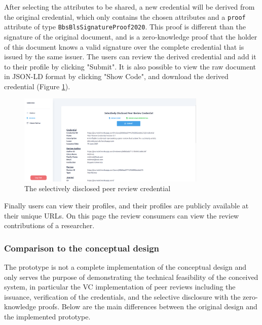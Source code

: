 After selecting the attributes to be shared, a new credential will be derived from the original credential, which only contains the chosen attributes and a \lstinline{proof} attribute of type \lstinline{BbsBlsSignatureProof2020}. This proof is different than the signature of the original document, and is a zero-knowledge proof that the holder of this document knows a valid signature over the complete credential that is issued by the same issuer. The users can review the derived credential and add it to their profile by clicking "Submit". It is also possible to view the raw document in \acrshort{JSON-LD} format by clicking "Show Code", and download the derived credential (Figure \ref{fig:derived-credential}).

\begin{figure}[htpb]
  \centering
  \includegraphics[width=0.8\textwidth]{figures/derived-credential.png}
  \caption{The selectively disclosed peer review credential} \label{fig:derived-credential}
\end{figure}

Finally users can view their profiles, and their profiles are publicly available at their unique \acrshort{URL}s. On this page the review consumers can view the review contributions of a researcher.

\subsubsection{Comparison to the conceptual design}

The prototype is not a complete implementation of the conceptual design and only serves the purpose of demonstrating the technical feasibility of the conceived system, in particular the \acrshort{VC} implementation of peer reviews including the issuance, verification of the credentials, and the selective disclosure with the zero-knowledge proofs. Below are the main differences between the original design and the implemented prototype.

